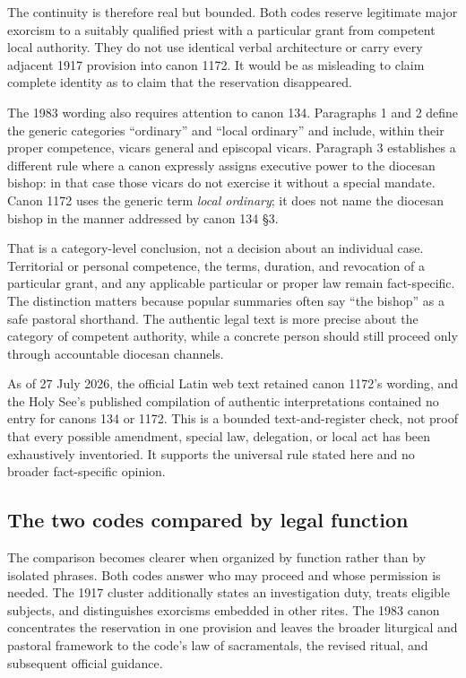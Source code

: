 The continuity is therefore real but bounded. Both codes reserve legitimate
major exorcism to a suitably qualified priest with a particular grant from
competent local authority. They do not use identical verbal architecture or
carry every adjacent 1917 provision into canon 1172. It would be as misleading
to claim complete identity as to claim that the reservation disappeared.

The 1983 wording also requires attention to canon 134. Paragraphs 1 and 2
define the generic categories ``ordinary'' and ``local ordinary'' and include,
within their proper competence, vicars general and episcopal vicars. Paragraph
3 establishes a different rule where a canon expressly assigns executive
power to the diocesan bishop: in that case those vicars do not exercise it
without a special mandate. Canon 1172 uses the generic term \emph{local
ordinary}; it does not name the diocesan bishop in the manner addressed by
canon 134 \S3.

That is a category-level conclusion, not a decision about an individual case.
Territorial or personal competence, the terms, duration, and revocation of a
particular grant, and any applicable particular or proper law remain
fact-specific. The distinction matters because popular summaries often say
``the bishop'' as a safe pastoral shorthand. The authentic legal text is more
precise about the category of competent authority, while a concrete person
should still proceed only through accountable diocesan channels.

As of 27 July 2026, the official Latin web text retained canon 1172's wording,
and the Holy See's published compilation of authentic interpretations
contained no entry for canons 134 or 1172. This is a bounded text-and-register
check, not proof that every possible amendment, special law, delegation, or
local act has been exhaustively inventoried. It supports the universal rule
stated here and no broader fact-specific opinion.

\subsection{The two codes compared by legal function}

The comparison becomes clearer when organized by function rather than by
isolated phrases. Both codes answer who may proceed and whose permission is
needed. The 1917 cluster additionally states an investigation duty, treats
eligible subjects, and distinguishes exorcisms embedded in other rites. The
1983 canon concentrates the reservation in one provision and leaves the
broader liturgical and pastoral framework to the code's law of sacramentals,
the revised ritual, and subsequent official guidance.

